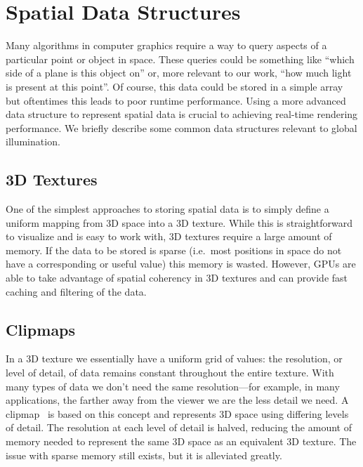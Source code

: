 
\section{Spatial Data Structures}
Many algorithms in computer graphics require a way to query aspects of a particular point or object in space. These queries could be something like ``which side of a plane is this object on'' or, more relevant to our work, ``how much light is present at this point''. Of course, this data could be stored in a simple array but oftentimes this leads to poor runtime performance. Using a more advanced data structure to represent spatial data is crucial to achieving real-time rendering performance. We briefly describe some common data structures relevant to global illumination.

\subsection{3D Textures}
One of the simplest approaches to storing spatial data is to simply define a uniform mapping from 3D space into a 3D texture. While this is straightforward to visualize and is easy to work with, 3D textures require a large amount of memory. If the data to be stored is sparse (i.e.\ most positions in space do not have a corresponding or useful value) this memory is wasted. However, GPUs are able to take advantage of spatial coherency in 3D textures and can provide fast caching and filtering of the data.

\subsection{Clipmaps}
In a 3D texture we essentially have a uniform grid of values: the resolution, or level of detail, of data remains constant throughout the entire texture. With many types of data we don't need the same resolution---for example, in many applications, the farther away from the viewer we are the less detail we need. A clipmap~\cite{Tanner:1998:CVM:280814.280855, Losasso:2004:GCT:1015706.1015799} is based on this concept and represents 3D space using differing levels of detail. The resolution at each level of detail is halved, reducing the amount of memory needed to represent the same 3D space as an equivalent 3D texture. The issue with sparse memory still exists, but it is alleviated greatly.


